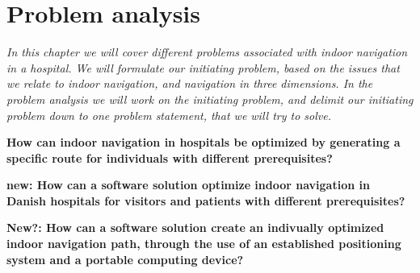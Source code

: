 \chapter{Problem analysis}

\textit{In this chapter we will cover different problems associated with indoor navigation in a hospital. We will formulate our initiating problem, based on the issues that we relate to indoor navigation, and navigation in three dimensions. In the problem analysis we will work on the initiating problem, and delimit our initiating problem down to one problem statement, that we will try to solve.
}

\textbf{How can indoor navigation in hospitals be optimized by generating a specific route for individuals with different prerequisites?}

\textbf{new: How can a software solution optimize indoor navigation in Danish hospitals for visitors and patients with different prerequisites?}

\textbf{New?: How can a software solution create an indivually optimized indoor navigation path, through the use of an established positioning system and a portable computing device?}
  







%
